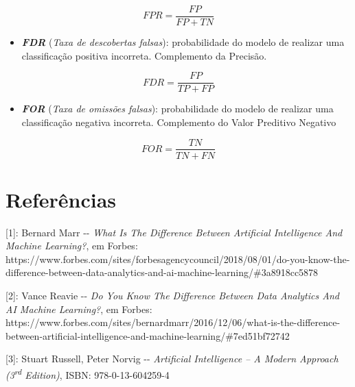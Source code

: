 \documentclass[]{article}
\begin{document}
\[FPR = \frac{FP}{FP + TN}\]

\begin{itemize}
\item
  \textbf{\emph{FDR}} (\emph{Taxa de descobertas falsas}): probabilidade
  do modelo de realizar uma classificação positiva incorreta.
  Complemento da Precisão.
\end{itemize}

\[FDR = \frac{FP}{TP + FP}\]

\begin{itemize}
\item
  \textbf{\emph{FOR}} (\emph{Taxa de omissões falsas}): probabilidade do
  modelo de realizar uma classificação negativa incorreta. Complemento
  do Valor Preditivo Negativo
\end{itemize}

\[FOR = \frac{TN}{TN + FN}\]

\hypertarget{header-n1166}{%
\section{Referências}\label{header-n1166}}

{[}1{]}: Bernard Marr -\/- \emph{What Is The Difference Between
Artificial Intelligence And Machine Learning?}, em Forbes:
https://www.forbes.com/sites/forbesagencycouncil/2018/08/01/do-you-know-the-difference-between-data-analytics-and-ai-machine-learning/\#3a8918cc5878

{[}2{]}: Vance Reavie -\/- \emph{Do You Know The Difference Between Data
Analytics And AI Machine Learning?}, em Forbes:
https://www.forbes.com/sites/bernardmarr/2016/12/06/what-is-the-difference-between-artificial-intelligence-and-machine-learning/\#7ed51bf72742

{[}3{]}: Stuart Russell, Peter Norvig -\/- \emph{Artificial Intelligence
-- A Modern Approach (3\textsuperscript{rd} Edition)}, ISBN:
978-0-13-604259-4
\end{document}
